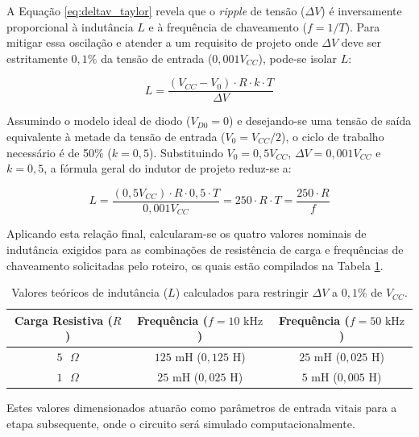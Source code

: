 A Equação \ref{eq:deltav_taylor} revela que o \textit{ripple} de tensão ($\Delta V$) é inversamente proporcional à indutância $L$ e à frequência de chaveamento ($f = 1/T$). Para mitigar essa oscilação e atender a um requisito de projeto onde $\Delta V$ deve ser estritamente $0,1\%$ da tensão de entrada ($0,001 V_{CC}$), pode-se isolar $L$:

\begin{equation}
	L = \frac{(V_{CC} - V_0) \cdot R \cdot k \cdot T}{\Delta V}
\end{equation}

Assumindo o modelo ideal de diodo ($V_{D0} = 0$) e desejando-se uma tensão de saída equivalente à metade da tensão de entrada ($V_0 = V_{CC}/2$), o ciclo de trabalho necessário é de 50\% ($k = 0,5$). Substituindo $V_0 = 0,5 V_{CC}$, $\Delta V = 0,001 V_{CC}$ e $k = 0,5$, a fórmula geral do indutor de projeto reduz-se a:

\begin{equation}
	L = \frac{(0,5 V_{CC}) \cdot R \cdot 0,5 \cdot T}{0,001 V_{CC}} = 250 \cdot R \cdot T = \frac{250 \cdot R}{f}
\end{equation}

Aplicando esta relação final, calcularam-se os quatro valores nominais de indutância exigidos para as combinações de resistência de carga e frequências de chaveamento solicitadas pelo roteiro, os quais estão compilados na Tabela \ref{tab:calculo_indutor}.

\begin{table}[H]
	\centering
	\caption{Valores teóricos de indutância ($L$) calculados para restringir $\Delta V$ a $0,1\%$ de $V_{CC}$.}
	\label{tab:calculo_indutor}
	\renewcommand{\arraystretch}{1.3}
	\begin{tabular}{ccc}
		\hline
		\textbf{Carga Resistiva ($R$)} & \textbf{Frequência ($f = 10\text{ kHz}$)} & \textbf{Frequência ($f = 50\text{ kHz}$)} \\ \hline
		$5\text{ }\Omega$ & $125\text{ mH}$ ($0,125\text{ H}$) & $25\text{ mH}$ ($0,025\text{ H}$) \\
		$1\text{ }\Omega$ & $25\text{ mH}$ ($0,025\text{ H}$) & $5\text{ mH}$ ($0,005\text{ H}$) \\ \hline
	\end{tabular}
\end{table}

Estes valores dimensionados atuarão como parâmetros de entrada vitais para a etapa subsequente, onde o circuito será simulado computacionalmente.